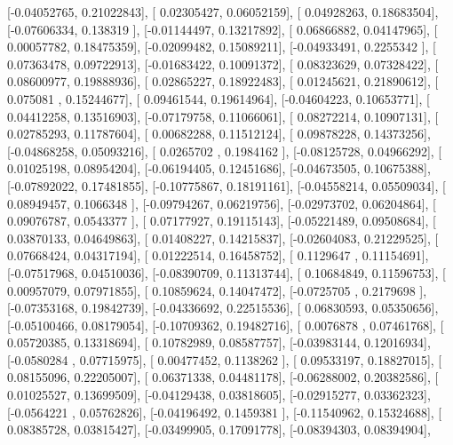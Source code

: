 \documentclass{article}
\begin{document}
       [-0.04052765,  0.21022843],
       [ 0.02305427,  0.06052159],
       [ 0.04928263,  0.18683504],
       [-0.07606334,  0.138319  ],
       [-0.01144497,  0.13217892],
       [ 0.06866882,  0.04147965],
       [ 0.00057782,  0.18475359],
       [-0.02099482,  0.15089211],
       [-0.04933491,  0.2255342 ],
       [ 0.07363478,  0.09722913],
       [-0.01683422,  0.10091372],
       [ 0.08323629,  0.07328422],
       [ 0.08600977,  0.19888936],
       [ 0.02865227,  0.18922483],
       [ 0.01245621,  0.21890612],
       [ 0.075081  ,  0.15244677],
       [ 0.09461544,  0.19614964],
       [-0.04604223,  0.10653771],
       [ 0.04412258,  0.13516903],
       [-0.07179758,  0.11066061],
       [ 0.08272214,  0.10907131],
       [ 0.02785293,  0.11787604],
       [ 0.00682288,  0.11512124],
       [ 0.09878228,  0.14373256],
       [-0.04868258,  0.05093216],
       [ 0.0265702 ,  0.1984162 ],
       [-0.08125728,  0.04966292],
       [ 0.01025198,  0.08954204],
       [-0.06194405,  0.12451686],
       [-0.04673505,  0.10675388],
       [-0.07892022,  0.17481855],
       [-0.10775867,  0.18191161],
       [-0.04558214,  0.05509034],
       [ 0.08949457,  0.1066348 ],
       [-0.09794267,  0.06219756],
       [-0.02973702,  0.06204864],
       [ 0.09076787,  0.0543377 ],
       [ 0.07177927,  0.19115143],
       [-0.05221489,  0.09508684],
       [ 0.03870133,  0.04649863],
       [ 0.01408227,  0.14215837],
       [-0.02604083,  0.21229525],
       [ 0.07668424,  0.04317194],
       [ 0.01222514,  0.16458752],
       [ 0.1129647 ,  0.11154691],
       [-0.07517968,  0.04510036],
       [-0.08390709,  0.11313744],
       [ 0.10684849,  0.11596753],
       [ 0.00957079,  0.07971855],
       [ 0.10859624,  0.14047472],
       [-0.0725705 ,  0.2179698 ],
       [-0.07353168,  0.19842739],
       [-0.04336692,  0.22515536],
       [ 0.06830593,  0.05350656],
       [-0.05100466,  0.08179054],
       [-0.10709362,  0.19482716],
       [ 0.0076878 ,  0.07461768],
       [ 0.05720385,  0.13318694],
       [ 0.10782989,  0.08587757],
       [-0.03983144,  0.12016934],
       [-0.0580284 ,  0.07715975],
       [ 0.00477452,  0.1138262 ],
       [ 0.09533197,  0.18827015],
       [ 0.08155096,  0.22205007],
       [ 0.06371338,  0.04481178],
       [-0.06288002,  0.20382586],
       [ 0.01025527,  0.13699509],
       [-0.04129438,  0.03818605],
       [-0.02915277,  0.03362323],
       [-0.0564221 ,  0.05762826],
       [-0.04196492,  0.1459381 ],
       [-0.11540962,  0.15324688],
       [ 0.08385728,  0.03815427],
       [-0.03499905,  0.17091778],
       [-0.08394303,  0.08394904],
\end{document}
